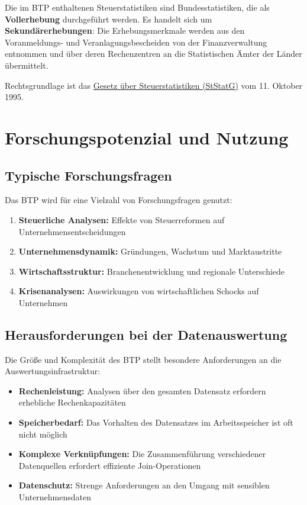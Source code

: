 \documentclass[
  ngerman,
  10pt,
  letterpaper,
  twocolumn]{book}
\providecommand{\tightlist}{%
  \setlength{\itemsep}{0pt}\setlength{\parskip}{0pt}}
\begin{document}
Die im BTP enthaltenen Steuerstatistiken sind Bundesstatistiken, die als
\textbf{Vollerhebung} durchgeführt werden. Es handelt sich um
\textbf{Sekundärerhebungen}: Die Erhebungsmerkmale werden aus den
Voranmeldungs- und Veranlagungsbescheiden von der Finanzverwaltung
entnommen und über deren Rechenzentren an die Statistischen Ämter der
Länder übermittelt.

Rechtsgrundlage ist das
\href{https://www.gesetze-im-internet.de/ststatg_1995/}{Gesetz über
Steuerstatistiken (StStatG)} vom 11. Oktober 1995.

\section{Forschungspotenzial und
Nutzung}\label{forschungspotenzial-und-nutzung}

\subsection{Typische Forschungsfragen}\label{typische-forschungsfragen}

Das BTP wird für eine Vielzahl von Forschungsfragen genutzt:

\begin{enumerate}
\def\labelenumi{\arabic{enumi}.}
\tightlist
\item
  \textbf{Steuerliche Analysen:} Effekte von Steuerreformen auf
  Unternehmensentscheidungen
\item
  \textbf{Unternehmensdynamik:} Gründungen, Wachstum und Marktaustritte
\item
  \textbf{Wirtschaftsstruktur:} Branchenentwicklung und regionale
  Unterschiede
\item
  \textbf{Krisenanalysen:} Auswirkungen von wirtschaftlichen Schocks auf
  Unternehmen
\end{enumerate}

\subsection{Herausforderungen bei der
Datenauswertung}\label{herausforderungen-bei-der-datenauswertung}

Die Größe und Komplexität des BTP stellt besondere Anforderungen an die
Auswertungsinfrastruktur:

\begin{itemize}
\tightlist
\item
  \textbf{Rechenleistung:} Analysen über den gesamten Datensatz
  erfordern erhebliche Rechenkapazitäten
\item
  \textbf{Speicherbedarf:} Das Vorhalten des Datensatzes im
  Arbeitsspeicher ist oft nicht möglich
\item
  \textbf{Komplexe Verknüpfungen:} Die Zusammenführung verschiedener
  Datenquellen erfordert effiziente Join-Operationen
\item
  \textbf{Datenschutz:} Strenge Anforderungen an den Umgang mit
  sensiblen Unternehmensdaten
\end{itemize}
\end{document}
